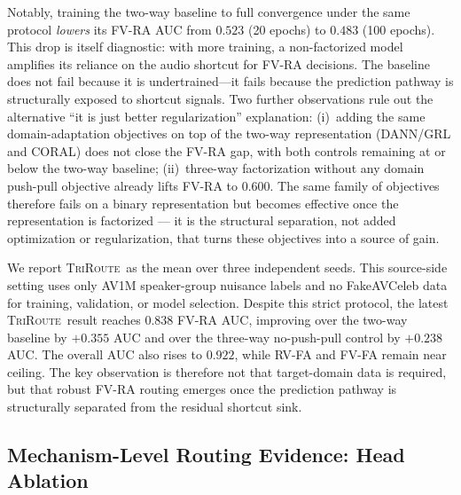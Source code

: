 \documentclass{article}
\newcommand{\method}{\textsc{TriRoute}}
\begin{document}
Notably, training the two-way baseline to full convergence under the same protocol \emph{lowers} its FV-RA AUC from $0.523$ (20 epochs) to $0.483$ (100 epochs). This drop is itself diagnostic: with more training, a non-factorized model amplifies its reliance on the audio shortcut for FV-RA decisions. The baseline does not fail because it is undertrained---it fails because the prediction pathway is structurally exposed to shortcut signals. Two further observations rule out the alternative ``it is just better regularization'' explanation: (i)~adding the same domain-adaptation objectives on top of the two-way representation (DANN/GRL and CORAL) does not close the FV-RA gap, with both controls remaining at or below the two-way baseline; (ii)~three-way factorization without any domain push-pull objective already lifts FV-RA to $0.600$. The same family of objectives therefore fails on a binary representation but becomes effective once the representation is factorized --- it is the structural separation, not added optimization or regularization, that turns these objectives into a source of gain.

We report \method\ as the mean over three independent seeds. This source-side setting uses only AV1M speaker-group nuisance labels and no FakeAVCeleb data for training, validation, or model selection. Despite this strict protocol, the latest \method\ result reaches $0.838$ FV-RA AUC, improving over the two-way baseline by $+0.355$ AUC and over the three-way no-push-pull control by $+0.238$ AUC. The overall AUC also rises to $0.922$, while RV-FA and FV-FA remain near ceiling. The key observation is therefore not that target-domain data is required, but that robust FV-RA routing emerges once the prediction pathway is structurally separated from the residual shortcut sink.

\subsection{Mechanism-Level Routing Evidence: Head Ablation}
\end{document}
